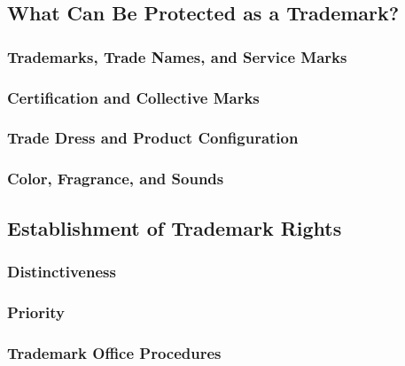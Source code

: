 \subsection{What Can Be Protected as a Trademark?}

\subsubsection{Trademarks, Trade Names, and Service Marks}


\subsubsection{Certification and Collective Marks}


\subsubsection{Trade Dress and Product Configuration}


\subsubsection{Color, Fragrance, and Sounds}


\subsection{Establishment of Trademark Rights}

\subsubsection{Distinctiveness}


\subsubsection{Priority}


\subsubsection{Trademark Office Procedures}


